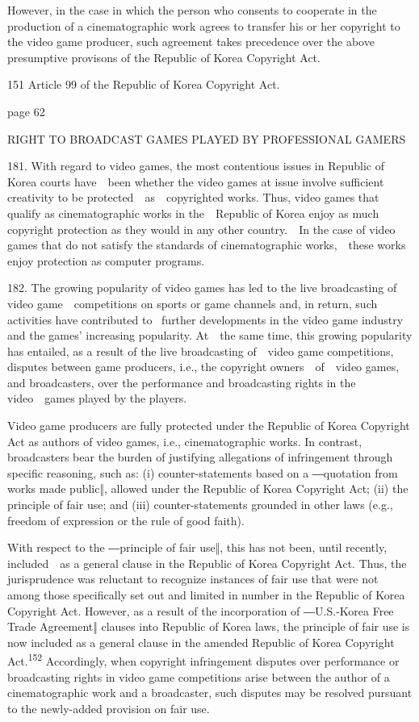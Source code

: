 \documentclass[
]{article}
\begin{document}
{However, in the case in which the person who consents to cooperate in
the production of a cinematographic work agrees to transfer his or her
copyright to the video game producer, such agreement takes precedence
over the above presumptive provisons of the Republic of Korea
}{Copyright Act}{.}

{151 }{Article 99 of the Republic of Korea }{Copyright Act}{.}

{page 62}

{RIGHT TO BROADCAST GAMES PLAYED BY PROFESSIONAL GAMERS}

{181. }{With regard to video games, the most contentious issues in
Republic of Korea courts have~~been whether the video games at issue
involve sufficient creativity to be protected~~as~~copyrighted works.
Thus, video games that qualify as cinematographic works in the~~Republic
of Korea enjoy as much copyright protection as they would in any other
country.~~In the case of video games that do not satisfy the standards
of cinematographic works,~~these works enjoy protection as computer
programs.}

{182. }{The growing popularity of video games has led to the live
broadcasting of video game~~competitions on sports or game channels and,
in return, such activities have contributed to }{~further developments
in the video game industry and the games' increasing popularity}{.
At~~the same time, this growing popularity has entailed, as a result of
the live broadcasting of~~video game competitions, disputes between game
producers, i.e., the copyright owners~~of~~video games, and
broadcasters, over the performance and broadcasting rights in the
video~~games played by the players.}

{Video game producers are fully protected under the Republic of Korea
}{Copyright Act }{as authors of video games, i.e., cinematographic
works. In contrast, broadcasters bear the burden of justifying
allegations of infringement through specific reasoning, such as: (i)
counter-}{statements based on a ―quotation from works made public‖,
allowed }{under the Republic of Korea }{Copyright Act}{; (ii) the
principle of fair use; and (iii) counter-statements grounded in other
laws (e.g., freedom of expression or the rule of good faith).}

{With respect to the ―principle of fair use‖, this has not been, until
}{recently, included~~as a general clause in the Republic of Korea
}{Copyright Act}{. Thus, the jurisprudence was reluctant to recognize
instances of fair use that were not among those specifically set out and
limited in number in the Republic of Korea }{Copyright Act}{. However,
as a result of the }{incorporation of ―U.S.}{-}{Korea Free Trade
Agreement‖ clauses into Republic of Korea laws, }{the principle of fair
use is now included as a general clause in the amended Republic of Korea
}{Copyright Act}{.}\textsuperscript{{152 }}{Accordingly, when copyright
infringement disputes over performance or broadcasting rights in video
game competitions arise between the author of a cinematographic work and
a broadcaster, such disputes may be resolved pursuant to the newly-added
provision on fair use.}
\end{document}
